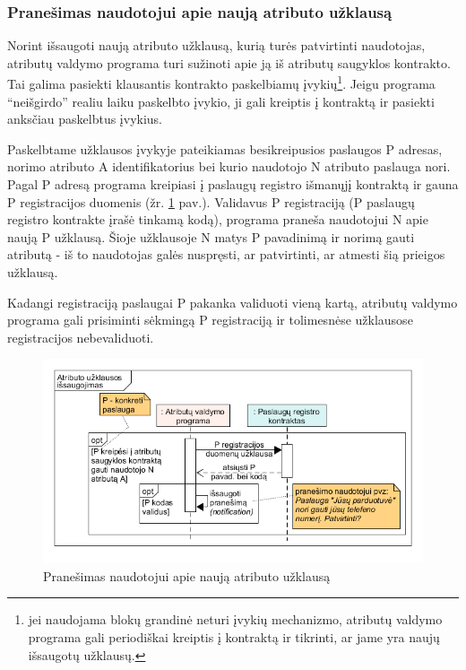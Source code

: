\subsubsection{Pranešimas naudotojui apie naują atributo užklausą} \label{BCIDM:blockchainMonitoring}

Norint išsaugoti naują atributo užklausą, kurią turės patvirtinti naudotojas, atributų valdymo programa turi sužinoti
apie ją iš atributų saugyklos kontrakto. Tai galima pasiekti klausantis kontrakto paskelbiamų įvykių\footnote{ jei naudojama blokų grandinė
neturi įvykių mechanizmo, atributų valdymo programa gali periodiškai kreiptis į kontraktą ir tikrinti, ar jame yra naujų išsaugotų užklausų.}. Jeigu programa \enquote{neišgirdo}
realiu laiku paskelbto įvykio, ji gali kreiptis į kontraktą ir pasiekti anksčiau paskelbtus įvykius.

Paskelbtame užklausos įvykyje pateikiamas besikreipusios paslaugos P adresas, norimo atributo A
identifikatorius bei kurio naudotojo N atributo paslauga nori. Pagal P adresą programa kreipiasi
į paslaugų registro išmanųjį kontraktą ir gauna P registracijos duomenis (žr. \hypertarget{fig:checkForPendingPermissions}{\ref{fig:checkForPendingPermissions}} pav.).
Validavus P registraciją (P paslaugų registro
kontrakte įrašė tinkamą kodą), programa praneša naudotojui N apie naują P užklausą. Šioje užklausoje N
matys P pavadinimą ir norimą gauti atributą - iš to naudotojas galės nuspręsti, ar patvirtinti, ar atmesti šią prieigos užklausą.

Kadangi registraciją paslaugai P pakanka validuoti vieną kartą, atributų valdymo programa gali prisiminti sėkmingą P registraciją
ir tolimesnėse užklausose registracijos nebevaliduoti.

\begin{figure}[H]
    \centering
    \includegraphics[scale=0.6]{img/checkForPendingPermissions}
    \caption{Pranešimas naudotojui apie naują atributo užklausą}
    \label{fig:checkForPendingPermissions}
\end{figure}

